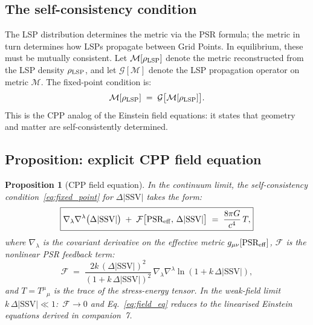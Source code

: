 \documentclass[12pt]{article}
\newtheorem{proposition}[theorem]{Proposition}
\newcommand{\SSV}{\text{SSV}}
\newcommand{\PSR}{\text{PSR}}
\begin{document}
\subsection{The self-consistency condition}
\label{subsec:selfconsistency}

The LSP distribution determines the metric via the PSR formula; the
metric in turn determines how LSPs propagate between Grid Points.
In equilibrium, these must be mutually consistent.  Let
$\mathcal{M}[\rho_{\rm LSP}]$ denote the metric reconstructed from
the LSP density $\rho_{\rm LSP}$, and let $\mathcal{G}[\mathcal{M}]$
denote the LSP propagation operator on metric $\mathcal{M}$.  The
fixed-point condition is:
\begin{equation}
  \mathcal{M}[\rho_{\rm LSP}] \;=\; \mathcal{G}\bigl[\mathcal{M}[\rho_{\rm LSP}]\bigr].
  \label{eq:fixed_point}
\end{equation}
This is the CPP analog of the Einstein field equations: it states that
geometry and matter are self-consistently determined.

\subsection{Proposition: explicit CPP field equation}
\label{subsec:field_eq}

\begin{proposition}[CPP field equation]
\label{prop:field_eq}
In the continuum limit, the self-consistency condition~\eqref{eq:fixed_point}
for $\Delta|\SSV|$ takes the form:
\begin{equation}
  \boxed{\nabla_\lambda\nabla^\lambda\bigl(\Delta|\SSV|\bigr)
  \;+\; \mathcal{F}\bigl[\PSR_{\rm eff},\,\Delta|\SSV|\bigr]
  \;=\; \frac{8\pi G}{c^4}\,T,}
  \label{eq:field_eq}
\end{equation}
where $\nabla_\lambda$ is the covariant derivative on the effective
metric $g_{\mu\nu}[\PSR_{\rm eff}]$, $\mathcal{F}$ is the nonlinear
PSR feedback term:
\begin{equation}
  \mathcal{F} \;=\; \frac{2k\,(\Delta|\SSV|)^2}
  {(1 + k\,\Delta|\SSV|)^2}\,\nabla_\lambda\nabla^\lambda
  \ln(1 + k\,\Delta|\SSV|),
  \label{eq:F_term}
\end{equation}
and $T = T^{\mu}{}_\mu$ is the trace of the stress-energy tensor.
In the weak-field limit $k\,\Delta|\SSV| \ll 1$:\ $\mathcal{F} \to 0$
and Eq.~\eqref{eq:field_eq} reduces to the linearised Einstein
equations derived in companion~7.
\end{proposition}
\end{document}
